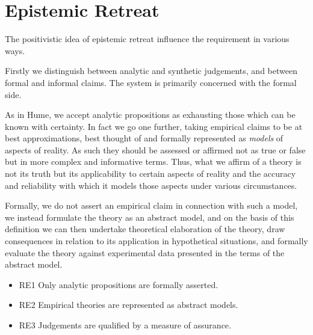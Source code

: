 \section{Epistemic Retreat}

The positivistic idea of epistemic retreat influence the requirement
in various ways.

Firstly we distinguish between analytic and synthetic judgements, and
between formal and informal claims.
The system is primarily concerned with the formal side.

As in Hume, we accept analytic propositions as exhausting those which
can be known with certainty.
In fact we go one further, taking empirical claims to be at best
approximations, best thought of and formally represented as
\emph{models} of aspects of reality.
As such they should be assessed or affirmed not as true or false but
in more complex and informative terms.
Thus, what we affirm of a theory is not its truth but its
applicability to certain aspects of reality and the accuracy and
reliability with which it models those aspects under various
circumstances. 

Formally, we do not assert an empirical claim in connection with such
a model, we instead formulate the theory as an abstract model, and on
the basis of this definition we can then undertake theoretical
elaboration of the theory, draw consequences in relation to its
application in hypothetical situations, and formally evaluate the
theory against experimental data presented in the terms of the
abstract model.


\begin{itemize}
\item{RE1} Only analytic propositions are formally asserted.
\item{RE2} Empirical theories are represented as abstract models.
\item{RE3} Judgements are qualified by a measure of assurance. 
\end{itemize}







